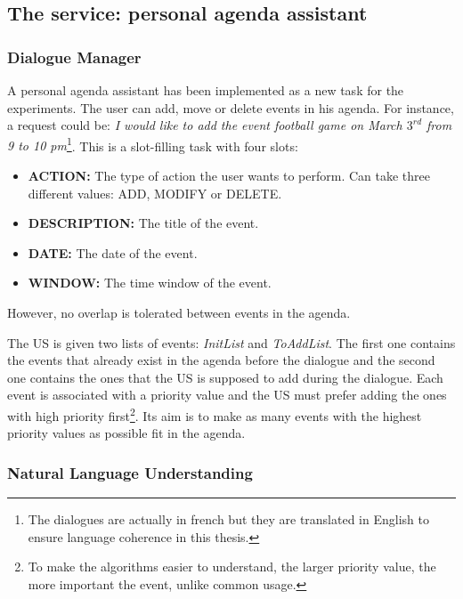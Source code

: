 	\subsection{The service: personal agenda assistant}
	
		\subsubsection{Dialogue Manager}

			A personal agenda assistant has been implemented as a new task for the experiments. The user can add, move or delete events in his agenda. For instance, a request could be: \textit{I would like to add the event football game on March $3^{rd}$ from 9 to 10 pm}\footnote{The dialogues are actually in french but they are translated in English to ensure language coherence in this thesis.}. This is a slot-filling task with four slots:
				
				\begin{itemize}
					\item \textbf{ACTION:} The type of action the user wants to perform. Can take three different values: ADD, MODIFY or DELETE.
						\item \textbf{DESCRIPTION:} The title of the event.
						\item \textbf{DATE:} The date of the event.
						\item \textbf{WINDOW:} The time window of the event.
				\end{itemize}
				
				However, no overlap is tolerated between events in the agenda.
				
				The US is given two lists of events: \textit{InitList} and \textit{ToAddList}. The first one contains the events that already exist in the agenda before the dialogue and the second one contains the ones that the US is supposed to add during the dialogue. Each event is associated with a priority value and the US must prefer adding the ones with high priority first\footnote{To make the algorithms easier to understand, the larger priority value, the more important the event, unlike common usage.}. Its aim is to make as many events with the highest priority values as possible fit in the agenda.
				
		
		\subsubsection{Natural Language Understanding}
		
